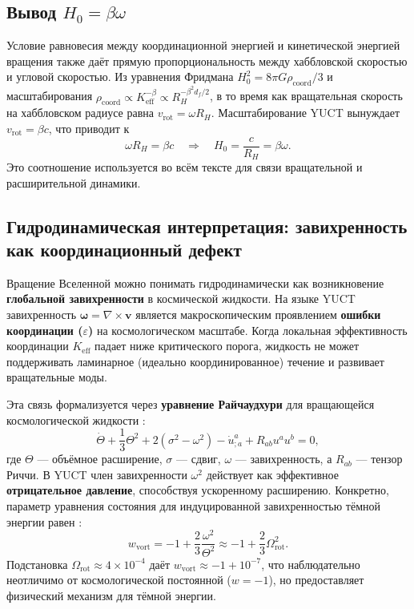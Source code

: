 \documentclass[11pt,a4paper]{article}
\begin{document}
	\subsection{Вывод \(H_0 = \beta \omega\)}
	
	Условие равновесия между координационной энергией и кинетической энергией вращения также даёт прямую пропорциональность между хаббловской скоростью и угловой скоростью. Из уравнения Фридмана \(H_0^2 = 8\pi G \rho_{\mathrm{coord}} / 3\) и масштабирования \(\rho_{\mathrm{coord}} \propto K_{\mathrm{eff}}^{-\beta} \propto R_H^{-\beta^2 d_f /2}\), в то время как вращательная скорость на хаббловском радиусе равна \(v_{\mathrm{rot}} = \omega R_H\). Масштабирование YUCT вынуждает \(v_{\mathrm{rot}} = \beta c\), что приводит к
	\begin{equation}
		\omega R_H = \beta c \quad \Rightarrow \quad H_0 = \frac{c}{R_H} = \beta \omega.
		\label{eq:H0-beta-omega}
	\end{equation}
	Это соотношение используется во всём тексте для связи вращательной и расширительной динамики.
	
	\subsection{Гидродинамическая интерпретация: завихренность как координационный дефект}
	
	Вращение Вселенной можно понимать гидродинамически как возникновение \textbf{глобальной завихренности} в космической жидкости. На языке YUCT завихренность \(\boldsymbol{\omega} = \nabla \times \mathbf{v}\) является макроскопическим проявлением \textbf{ошибки координации (\(\varepsilon\))} на космологическом масштабе. Когда локальная эффективность координации \(K_{\mathrm{eff}}\) падает ниже критического порога, жидкость не может поддерживать ламинарное (идеально координированное) течение и развивает вращательные моды.
	
	Эта связь формализуется через \textbf{уравнение Райчаудхури} для вращающейся космологической жидкости \cite{Ellis1971}:
	\begin{equation}
		\dot{\Theta} + \frac{1}{3}\Theta^2 + 2(\sigma^2 - \omega^2) - \dot{u}^a_{;a} + R_{ab}u^a u^b = 0,
	\end{equation}
	где \(\Theta\) — объёмное расширение, \(\sigma\) — сдвиг, \(\omega\) — завихренность, а \(R_{ab}\) — тензор Риччи. В YUCT член завихренности \(\omega^2\) действует как эффективное \textbf{отрицательное давление}, способствуя ускоренному расширению. Конкретно, параметр уравнения состояния для индуцированной завихренностью тёмной энергии равен \cite{Tsagas2011}:
	\begin{equation}
		w_{\mathrm{vort}} = -1 + \frac{2}{3}\frac{\omega^2}{\Theta^2} \approx -1 + \frac{2}{3}\Omega_{\mathrm{rot}}^2.
	\end{equation}
	Подстановка \(\Omega_{\mathrm{rot}} \approx 4 \times 10^{-4}\) даёт \(w_{\mathrm{vort}} \approx -1 + 10^{-7}\), что наблюдательно неотличимо от космологической постоянной (\(w = -1\)), но предоставляет физический механизм для тёмной энергии.
	
\end{document}
